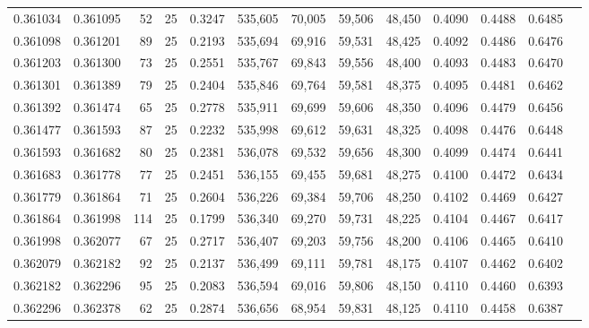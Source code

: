 \begin{tabular}{rrrrrrrrrrrrr}
0.361034 & 0.361095 &    52 &  25 &                                     0.3247 & 535,605 &  70,005 &  59,506 &  48,450 & 0.4090 & 0.4488 & 0.6485 \\
0.361098 & 0.361201 &    89 &  25 &                                     0.2193 & 535,694 &  69,916 &  59,531 &  48,425 & 0.4092 & 0.4486 & 0.6476 \\
0.361203 & 0.361300 &    73 &  25 &                                     0.2551 & 535,767 &  69,843 &  59,556 &  48,400 & 0.4093 & 0.4483 & 0.6470 \\
0.361301 & 0.361389 &    79 &  25 &                                     0.2404 & 535,846 &  69,764 &  59,581 &  48,375 & 0.4095 & 0.4481 & 0.6462 \\
0.361392 & 0.361474 &    65 &  25 &                                     0.2778 & 535,911 &  69,699 &  59,606 &  48,350 & 0.4096 & 0.4479 & 0.6456 \\
0.361477 & 0.361593 &    87 &  25 &                                     0.2232 & 535,998 &  69,612 &  59,631 &  48,325 & 0.4098 & 0.4476 & 0.6448 \\
0.361593 & 0.361682 &    80 &  25 &                                     0.2381 & 536,078 &  69,532 &  59,656 &  48,300 & 0.4099 & 0.4474 & 0.6441 \\
0.361683 & 0.361778 &    77 &  25 &                                     0.2451 & 536,155 &  69,455 &  59,681 &  48,275 & 0.4100 & 0.4472 & 0.6434 \\
0.361779 & 0.361864 &    71 &  25 &                                     0.2604 & 536,226 &  69,384 &  59,706 &  48,250 & 0.4102 & 0.4469 & 0.6427 \\
0.361864 & 0.361998 &   114 &  25 &                                     0.1799 & 536,340 &  69,270 &  59,731 &  48,225 & 0.4104 & 0.4467 & 0.6417 \\
0.361998 & 0.362077 &    67 &  25 &                                     0.2717 & 536,407 &  69,203 &  59,756 &  48,200 & 0.4106 & 0.4465 & 0.6410 \\
0.362079 & 0.362182 &    92 &  25 &                                     0.2137 & 536,499 &  69,111 &  59,781 &  48,175 & 0.4107 & 0.4462 & 0.6402 \\
0.362182 & 0.362296 &    95 &  25 &                                     0.2083 & 536,594 &  69,016 &  59,806 &  48,150 & 0.4110 & 0.4460 & 0.6393 \\
0.362296 & 0.362378 &    62 &  25 &                                     0.2874 & 536,656 &  68,954 &  59,831 &  48,125 & 0.4110 & 0.4458 & 0.6387 \\

\end{tabular}

